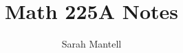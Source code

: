 \documentclass[
    letterpaper,
    fontsize=12pt,
    twoside=false,
    secnumdepth=1
]{kaonotes}
\begin{document}
    \title[Math 225A Notes]{Math 225A Notes}

    \author{Sarah Mantell}
    
    \frontmatter
    \maketitle

    \mainmatter
    
    
\end{document}
